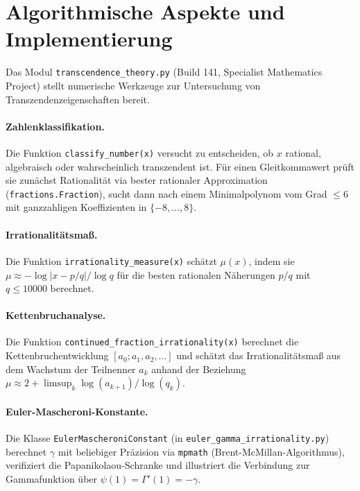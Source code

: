 \documentclass[12pt,a4paper]{amsart}
\theoremstyle{definition}
\begin{document}
\section{Algorithmische Aspekte und Implementierung}
\label{sec:algorithmisch}

Das Modul \texttt{transcendence\_theory.py} (Build 141, Specialist Mathematics
Project) stellt numerische Werkzeuge zur Untersuchung von Transzendenzeigenschaften
bereit.

\paragraph{Zahlenklassifikation.}
Die Funktion \texttt{classify\_number(x)} versucht zu entscheiden, ob $x$
rational, algebraisch oder wahrscheinlich transzendent ist. Für einen
Gleitkommawert prüft sie zunächst Rationalität via bester rationaler
Approximation (\texttt{fractions.Fraction}), sucht dann nach einem
Minimalpolynom vom Grad $\leq 6$ mit ganzzahligen Koeffizienten in
$\{-8, \ldots, 8\}$.

\paragraph{Irrationalitätsmaß.}
Die Funktion \texttt{irrationality\_measure(x)} schätzt $\mu(x)$, indem sie
$\mu \approx -\log|x - p/q|/\log q$ für die besten rationalen Näherungen
$p/q$ mit $q \leq 10000$ berechnet.

\paragraph{Kettenbruchanalyse.}
Die Funktion \texttt{continued\_fraction\_irrationality(x)} berechnet die
Kettenbruchentwicklung $[a_0; a_1, a_2, \ldots]$ und schätzt das
Irrationalitätsmaß aus dem Wachstum der Teilnenner $a_k$ anhand der Beziehung
$\mu \approx 2 + \limsup_k \log(a_{k+1})/\log(q_k)$.

\paragraph{Euler-Mascheroni-Konstante.}
Die Klasse \texttt{EulerMascheroniConstant} (in
\texttt{euler\_gamma\_irrationality.py}) berechnet $\gamma$ mit beliebiger
Präzision via \texttt{mpmath} (Brent-McMillan-Algorithmus), verifiziert die
Papanikolaou-Schranke und illustriert die Verbindung zur Gammafunktion
über $\psi(1) = \Gamma'(1) = -\gamma$.
\end{document}
